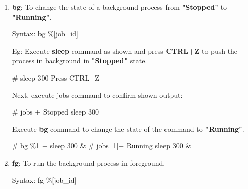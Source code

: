 \begin{flushleft}
\begin{enumerate}
\begin{itemize}
\begin{enumerate}
			\bigskip
			
			\item \textbf{bg}: To change the state of a background process from \textbf{"Stopped"} to \textbf{"Running"}.
			\begin{tcolorbox}[breakable,notitle,boxrule=-0pt,colback=pink,colframe=pink]
				\color{black}
				\font=9pt
				Syntax: bg \%[job\_id]
				\font=4pt
			\end{tcolorbox}
			
			Eg: Execute \textbf{sleep} command as shown and press \textbf{CTRL+Z} to push the process in background in \textbf{"Stopped"} state.
			\begin{tcolorbox}[breakable,notitle,boxrule=-0pt,colback=black,colframe=black]
				\color{green}
				\font=9pt
				\# sleep 300 
				\color{yellow}
				\newline
				Press CTRL+Z
				\font=4pt
			\end{tcolorbox}
			Next, execute jobs command to confirm shown output:
			\begin{tcolorbox}[breakable,notitle,boxrule=-0pt,colback=black,colframe=black]
				\color{green}
				\font=9pt
				\# jobs 
				\color{white}
				\newline
				[1]+  Stopped                 sleep 300
				\font=4pt
			\end{tcolorbox}
			Execute \textbf{bg} command to change the state of the command to \textbf{"Running"}.
			\begin{tcolorbox}[breakable,notitle,boxrule=-0pt,colback=black,colframe=black]
				\color{green}
				\font=9pt
				\# bg \%1
				\color{white}
				\newline
				[1]+ sleep 300 \&
				\newline
				\color{green}
				\# jobs
				\color{white}
				\newline
				\color{white}
				[1]+  Running             sleep 300 \&
				\font=4pt
			\end{tcolorbox}
			
			\bigskip
			\bigskip
			
				\item \textbf{fg}: To run the background process in foreground.
			\begin{tcolorbox}[breakable,notitle,boxrule=-0pt,colback=pink,colframe=pink]
				\color{black}
				\font=9pt
				Syntax: fg \%[job\_id]
				\font=4pt
			\end{tcolorbox}
			

\end{enumerate}
\end{itemize}
\end{enumerate}
\end{flushleft}
